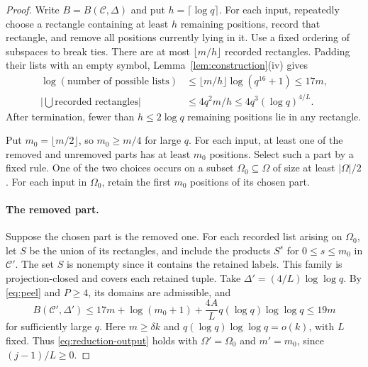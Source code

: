 \documentclass[11pt,a4paper]{article}
\numberwithin{equation}{section}
\newcommand{\cC}{\mathcal C}
\begin{document}
\begin{proof}
Write $B=B(\cC,\Delta)$ and put $h=\lceil\log q\rceil$.
For each input, repeatedly choose a rectangle containing at
least $h$ remaining positions, record that rectangle, and remove
all positions currently lying in it. Use a fixed ordering of
subspaces to break ties. There are at most $\lfloor m/h\rfloor$
recorded rectangles. Padding their lists with an empty symbol,
Lemma~\ref{lem:construction}(iv) gives
\begin{equation}\label{eq:peel}
 \begin{aligned}
 \log(\text{number of possible lists})
 &\le\lfloor m/h\rfloor\log(q^{16}+1)\le17m,\\
 \left|\bigcup\text{recorded rectangles}\right|
 &\le4q^2m/h\le4q^3(\log q)^{4/L}.
 \end{aligned}
\end{equation}
After termination, fewer than $h\le2\log q$ remaining positions
lie in any rectangle.

Put $m_0=\lfloor m/2\rfloor$, so $m_0\ge m/4$ for large $q$.
For each input, at least one of the removed and unremoved parts
has at least $m_0$ positions. Select such a part by a fixed rule.
One of the two choices occurs on a subset $\Omega_0\subseteq\Omega$
of size at least $|\Omega|/2$.
For each input in $\Omega_0$, retain the first $m_0$ positions
of its chosen part.

\paragraph{The removed part.}
Suppose the chosen part is the removed one.
For each recorded list arising on $\Omega_0$, let $S$ be the
union of its rectangles, and include the products $S^s$ for
$0\le s\le m_0$ in $\cC'$.
The set $S$ is nonempty since it contains the retained labels.
This family is projection-closed and covers each retained tuple.
Take $\Delta'=(4/L)\log\log q$.
By \eqref{eq:peel} and $P\ge4$, its domains are admissible, and
\[
 B(\cC',\Delta')
 \le17m+\log(m_0+1)
       +\frac{4A}{L}q(\log q)\log\log q
 \le19m
\]
for sufficiently large $q$.
Here $m\ge\delta k$ and
$q(\log q)\log\log q=o(k)$, with $L$ fixed.
Thus \eqref{eq:reduction-output} holds with
$\Omega'=\Omega_0$ and $m'=m_0$, since $(j-1)/L\ge0$.


\end{proof}
\end{document}
